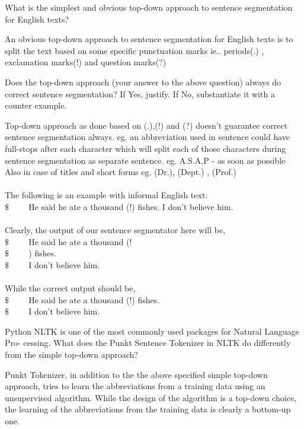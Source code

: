 \documentclass[11pt]{exam}
\begin{document}
\begin{questions}
\question What is the simplest and obvious top-down approach to sentence segmentation for English
texts?
\begin{solution}
An obvious top-down approach to sentence segmentation for English texts is to split the text based on some specific punctuation marks ie.. periods(.) , exclamation marks(!) and question marks(?)

\end{solution}
\question Does the top-down approach (your answer to the above question) always do correct sentence segmentation? If Yes, justify. If No, substantiate it with a counter example.
\begin{solution}
    Top-down approach as done based on (.),(!) and (?) doesn't guarantee correct sentence segmentation always. eg. an abbreviation used in sentence could have full-stops after each character which will split each of those characters during sentence segmentation as separate sentence. eg. A.S.A.P - as soon as possible
    Also in case of titles and short forms eg. (Dr.), (Dept.) , (Prof.)\\\\
    The following is an example with informal English text:\\
    $\$\hspace{1cm}$He said he ate a thousand (!) fishes. I don't believe him.\\\\
    Clearly, the output of our sentence segmentator here will be,\\
    $\$\hspace{1cm}$He said he ate a thousand (!\\
    $\$\hspace{1cm}$) fishes.\\
    $\$\hspace{1cm}$I don't believe him.\\\\
    While the correct output should be,\\
    $\$\hspace{1cm}$He said he ate a thousand (!) fishes.\\
    $\$\hspace{1cm}$I don't believe him.
    
\end{solution}


\question Python NLTK is one of the most commonly used packages for Natural Language Pro-
cessing. What does the Punkt Sentence Tokenizer in NLTK do differently from the simple
top-down approach?
\begin{solution}
    Punkt Tokenizer, in addition to the the above specified simple top-down approach, tries to learn the abbreviations from a training data using an unsupervised algorithm. While the design of the algorithm is a top-down choice, the learning of the abbreviations from the training data is clearly a bottom-up one.
\end{solution}


\end{questions}
\end{document}
